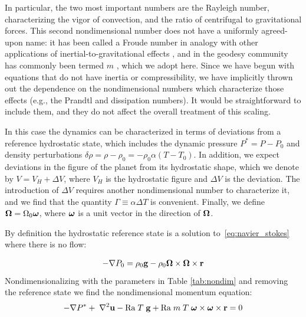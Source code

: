 \documentclass[extra,mreferee]{gji}
\begin{document}
In particular, the two most important numbers are the Rayleigh number, characterizing the vigor of convection, and the ratio of centrifugal to gravitational forces.
This second nondimensional number does not have a uniformly agreed-upon name: it has been called a Froude number in analogy with other applications of inertial-to-gravitational effects \citep{mckenzie1968influence}, 
and in the geodesy community has commonly been termed $m$ \citep[e.g.][]{nakiboglu1982hydrostatic, chambat2010flattening}, which we adopt here.
Since we have begun with equations that do not have inertia or compressibility, we have implicitly thrown out the dependence on the nondimensional numbers which characterize those effects (e.g., the Prandtl and dissipation numbers).
It would be straightforward to include them, and they do not affect the overall treatment of this scaling.

In this case the dynamics can be characterized in terms of deviations from a reference hydrostatic state, which includes the dynamic pressure $P^* = P - P_0$ and density perturbations $\delta \rho = \rho- \rho_0 = - \rho_0 \alpha (T-T_0)$.
In addition, we expect deviations in the figure of the planet from its hydrostatic shape, which we denote by $V = V_H + \Delta V$, where $V_H$ is the hydrostatic figure and $\Delta V$ is the deviation.
The introduction of $\Delta V$ requires another nondimensional number to characterize it, and we find that the quantity $\Gamma \equiv \alpha \Delta T$ is convenient.
Finally, we define $\mitbf{\Omega} = \Omega_0 \mitbf{\omega}$, where $\mitbf{\omega}$ is a unit vector in the direction of $\mitbf{\Omega}$.

By definition the hydrostatic reference state is a solution to~\eqref{eq:navier_stokes} where there is no flow:

\begin{equation}
\begin{aligned}
- \nabla P_0 =  \rho_0 \mathbf{g} -  \rho_0 \mitbf{\Omega} \times \mitbf{\Omega} \times \mathbf{r}
\label{eq:hydrostatic}
\end{aligned}
\end{equation}
Nondimensionalizing with the parameters in Table \ref{tab:nondim} and removing the reference state we find the nondimensional momentum equation:
\begin{equation}
\begin{aligned}
 - \nabla P^* + \; \nabla^2 \mathbf{u} - \mathrm{Ra} \; T \; \mathbf{g} + \mathrm{Ra} \; m \; T \;{\mitbf{\omega} \times \mitbf{\omega} \times \mathbf{r}} = 0
\end{aligned}
\end{equation}
\end{document}

